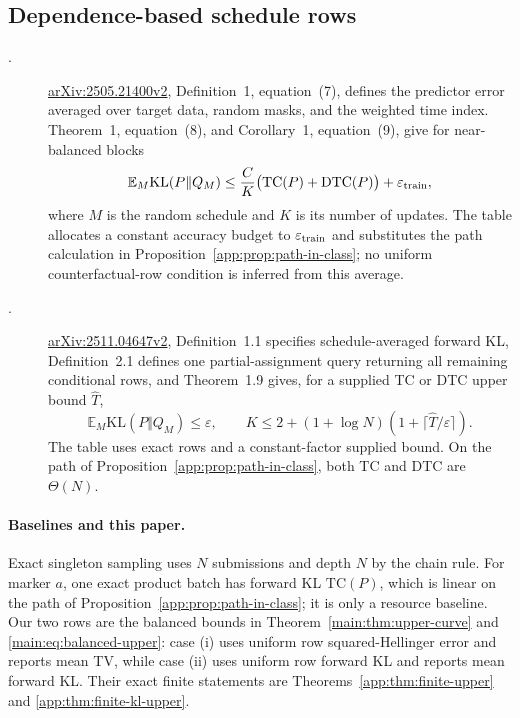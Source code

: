 \subsection{Dependence-based schedule rows}
\label{app:comparison-unmasking-errors}

\begin{description}
\item[.]
\href{https://arxiv.org/html/2505.21400v2}{arXiv:2505.21400v2},
Definition~1, equation~(7), defines the predictor error averaged over target
data, random masks, and the weighted time index.  Theorem~1, equation~(8), and
Corollary~1, equation~(9), give for near-balanced blocks
\[
 \mathbb E_M\mathrm{KL}(P\Vert Q_M)
 \le \frac{C}{K}\bigl(\mathrm{TC}(P)+\mathrm{DTC}(P)\bigr)
      +\varepsilon_{\rm train},
\]
where $M$ is the random schedule and $K$ is its number of updates.  The table
allocates a constant accuracy budget to $\varepsilon_{\rm train}$ and
substitutes the path calculation in
Proposition~\ref{app:prop:path-in-class}; no uniform counterfactual-row
condition is inferred from this average.

\item[.]
\href{https://arxiv.org/html/2511.04647v2}{arXiv:2511.04647v2},
Definition~1.1 specifies schedule-averaged forward KL, Definition~2.1 defines
one partial-assignment query returning all remaining conditional rows, and
Theorem~1.9 gives, for a supplied TC or DTC upper bound $\widehat T$,
\begin{equation}
 \mathbb E_M\mathrm{KL}(P\Vert Q_M)\le\varepsilon,
 \qquad
 K\le2+(1+\log N)(1+\lceil\widehat T/\varepsilon\rceil).
 \label{app:eq:chen-native-bound}
\end{equation}
The table uses exact rows and a constant-factor supplied bound.  On the path of
Proposition~\ref{app:prop:path-in-class}, both TC and DTC are $\Theta(N)$.
\end{description}

\paragraph{Baselines and this paper.}
Exact singleton sampling uses $N$ submissions and depth $N$ by the chain rule.
For marker $a$, one exact product batch has forward KL
$\mathrm{TC}(P)$, which is linear on the path of
Proposition~\ref{app:prop:path-in-class}; it is only a resource baseline.
Our two rows are the balanced bounds in
Theorem~\ref{main:thm:upper-curve} and
\eqref{main:eq:balanced-upper}: case (i) uses uniform row squared-Hellinger
error and reports mean TV, while case (ii) uses uniform row forward KL and
reports mean forward KL.  Their exact finite statements are
Theorems~\ref{app:thm:finite-upper} and
\ref{app:thm:finite-kl-upper}.

